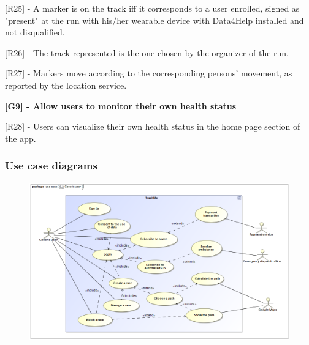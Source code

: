 [R25] - A marker is on the track iff it corresponds to a user enrolled, signed as "present" at the run with his/her wearable device with Data4Help installed and not disqualified. \newline

[R26] - The track represented is the one chosen by the organizer of the run. \newline

[R27] - Markers move according to the corresponding persons' movement, as reported by the location service. \newline

\hspace{-\parindent}\textbf{[G9] - Allow users to monitor their own health status} \newline

[R28] - Users can visualize their own health status in the home page section of the app. \newline
\newpage

\subsubsection{Use case diagrams}
\begin{figure}[h!]
\centering
\includegraphics[scale=0.44]{sections/diagrams/Generic_user.png} \newline
{}
\end{figure}

